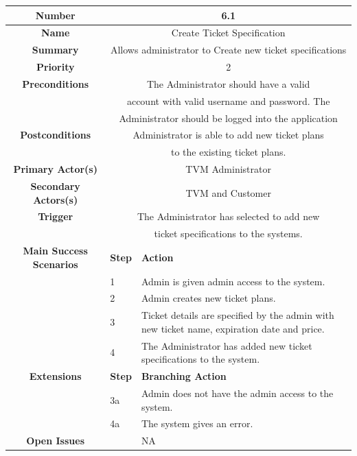 \documentclass[a4paper,12pt]{report}
\begin{document}
\begin{tabular}{ | c | p{2cm} | p{7cm} |}
	
	\hline
	\textbf{Number} & \multicolumn{2}{c|}{6.1}  \\
	\hline
	\textbf{Name} & \multicolumn{2}{c|}{Create Ticket Specification}  \\
	\hline
	\textbf{Summary} & \multicolumn{2}{c|}{Allows administrator to Create new ticket specifications}  \\
	\hline
	\textbf{Priority} & \multicolumn{2}{c|}{2}  \\
	\hline
	\textbf{Preconditions} & \multicolumn{2}{c|}{The Administrator should have a valid }  \\
			  &  \multicolumn{2	}{c|}{account with valid username and password. The  } \\
			  &  \multicolumn{2	}{c|}{Administrator should be logged into the application} \\
	\hline
	\textbf{Postconditions} & \multicolumn{2}{c|}{Administrator is able to add new ticket plans }  \\
   	 			&  \multicolumn{2}{c|}{to the existing ticket plans. } \\
	\hline
	\textbf{Primary Actor(s)} & \multicolumn{2}{c|}{TVM Administrator}  \\
	\hline
	\textbf{Secondary Actors(s)} & \multicolumn{2}{c|}{TVM and Customer}  \\
	\hline
	\textbf{Trigger} & \multicolumn{2}{c|}{The Administrator has selected to add new}  \\
     	&  \multicolumn{2}{c|}{ ticket specifications to the systems.} \\
	\hline
	\textbf{Main Success Scenarios} & \textbf{Step} & \textbf{Action} \\
	\hline
	& 1 & Admin is given admin access to the system. \\ 
	\hline
	&  2  & Admin creates new ticket plans. \\
	\hline
	&  3  & Ticket details are specified by the admin with new ticket name, expiration date and price. \\
	\hline
	&  4  & The Administrator has added new ticket specifications to the system. \\
	\hline
	
	\textbf{Extensions} & \textbf{Step} & \textbf{Branching Action} \\
	\hline
	&  3a  & Admin does not have the admin access to the system.  \\
	\hline
	&  4a  &  The system gives an error. \\
	\hline
	\textbf{Open Issues} &    & NA \\
	\hline
	
\end{tabular}
\end{document}
